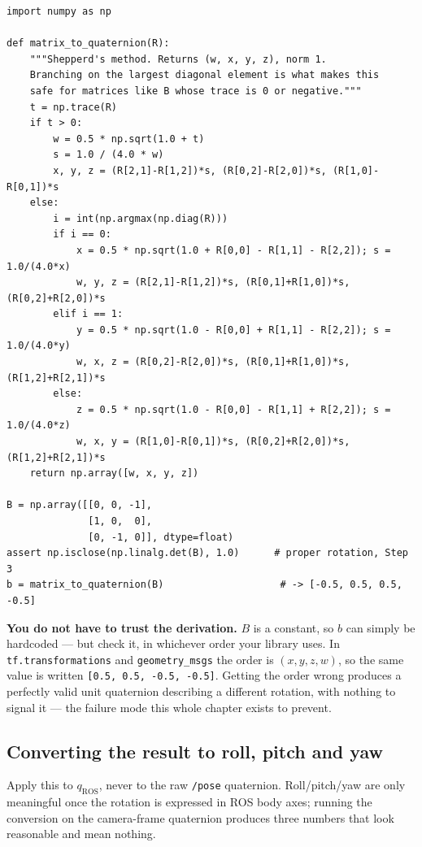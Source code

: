 \documentclass[11pt]{report}
\newenvironment{warningbox}%
  {\begin{lrbox}{\warnbox}\begin{minipage}{0.90\textwidth}}%
  {\end{minipage}\end{lrbox}%
   \begin{center}\fcolorbox{black}{codebg}{\usebox{\warnbox}}\end{center}}
\begin{document}
\begin{lstlisting}[style=code]
import numpy as np

def matrix_to_quaternion(R):
    """Shepperd's method. Returns (w, x, y, z), norm 1.
    Branching on the largest diagonal element is what makes this
    safe for matrices like B whose trace is 0 or negative."""
    t = np.trace(R)
    if t > 0:
        w = 0.5 * np.sqrt(1.0 + t)
        s = 1.0 / (4.0 * w)
        x, y, z = (R[2,1]-R[1,2])*s, (R[0,2]-R[2,0])*s, (R[1,0]-R[0,1])*s
    else:
        i = int(np.argmax(np.diag(R)))
        if i == 0:
            x = 0.5 * np.sqrt(1.0 + R[0,0] - R[1,1] - R[2,2]); s = 1.0/(4.0*x)
            w, y, z = (R[2,1]-R[1,2])*s, (R[0,1]+R[1,0])*s, (R[0,2]+R[2,0])*s
        elif i == 1:
            y = 0.5 * np.sqrt(1.0 - R[0,0] + R[1,1] - R[2,2]); s = 1.0/(4.0*y)
            w, x, z = (R[0,2]-R[2,0])*s, (R[0,1]+R[1,0])*s, (R[1,2]+R[2,1])*s
        else:
            z = 0.5 * np.sqrt(1.0 - R[0,0] - R[1,1] + R[2,2]); s = 1.0/(4.0*z)
            w, x, y = (R[1,0]-R[0,1])*s, (R[0,2]+R[2,0])*s, (R[1,2]+R[2,1])*s
    return np.array([w, x, y, z])

B = np.array([[0, 0, -1],
              [1, 0,  0],
              [0, -1, 0]], dtype=float)
assert np.isclose(np.linalg.det(B), 1.0)      # proper rotation, Step 3
b = matrix_to_quaternion(B)                    # -> [-0.5, 0.5, 0.5, -0.5]
\end{lstlisting}

\textbf{You do not have to trust the derivation.} $B$ is a constant, so $b$
can simply be hardcoded --- but check it, in whichever order your library
uses. In \texttt{tf.transformations} and \texttt{geometry\_msgs} the order is
$(x,y,z,w)$, so the same value is written \texttt{[0.5, 0.5, -0.5, -0.5]}.
Getting the order wrong produces a perfectly valid unit quaternion
describing a different rotation, with nothing to signal it --- the failure
mode this whole chapter exists to prevent.

\subsection{Converting the result to roll, pitch and yaw}
\label{sec:rpy}

\begin{warningbox}
Apply this to $q_{\text{ROS}}$, never to the raw \texttt{/pose} quaternion.
Roll/pitch/yaw are only meaningful once the rotation is expressed in ROS
body axes; running the conversion on the camera-frame quaternion produces
three numbers that look reasonable and mean nothing.
\end{warningbox}
\end{document}
